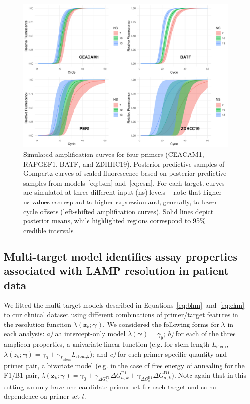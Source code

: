 \documentclass[../thesis.tex]{subfiles}
\begin{document}
\begin{figure}[!tpb] 
\centering
\includegraphics[width=6in]{../figures/chapter2/single_target_model_comparisons.png}
\caption{Simulated amplification curves for four primers ({CEACAM1}, {RAPGEF1}, {BATF}, and {ZDHHC19}). Posterior predictive samples of Gompertz curves of scaled fluorescence based on posterior predictive samples from models~\ref{eq:bsm} and~\ref{eq:csm}. For each target, curves are simulated at three different  input (\gls{ns}) levels -- note that higher \gls{ns} values correspond to higher expression and, generally, to lower cycle offsets (left-shifted amplification curves). Solid lines depict posterior means, while highlighted regions correspond to 95\% credible intervals. \label{fig:sm_comp_plot}}
\end{figure}


\subsection{Multi-target model identifies assay properties associated with LAMP resolution in patient data\label{sec:hierarchicalresults}}
We fitted the multi-target models described in Equations~\ref{eq:bhm}~and~\ref{eq:chm} to our clinical dataset using different combinations of primer/target features in the resolution function $\lambda(\bm{z}_{k}; \bm{\gamma})$. We considered the following forms for $\lambda$ in each analysis: \emph{a)} an intercept-only model $\lambda(\bm{\gamma}) = \gamma_0$; \emph{b)} for each of the three amplicon properties, a univariate linear function (e.g. for stem length $L_{\text{stem}}$, $\lambda(z_{k}; \bm{\gamma}) = \gamma_0 + \gamma_{L_{\text{stem}}} L_{\text{stem,k}}$); and \emph{c)} for each primer-specific quantity and primer pair, a bivariate model (e.g. in the case of free energy of annealing for the F1/B1 pair, $\lambda(\bm{z}_{k}; \bm{\gamma}) = \gamma_0 + \gamma_{\Delta G_a^{\text{F1}}} \Delta G_{a,k}^{\text{F1}} + \gamma_{\Delta G_a^{\text{B1}}} \Delta G_{a,k}^{\text{B1}}$). Note again that in this setting we only have one candidate primer set for each target and so no dependence on primer set $l$.
\end{document}
